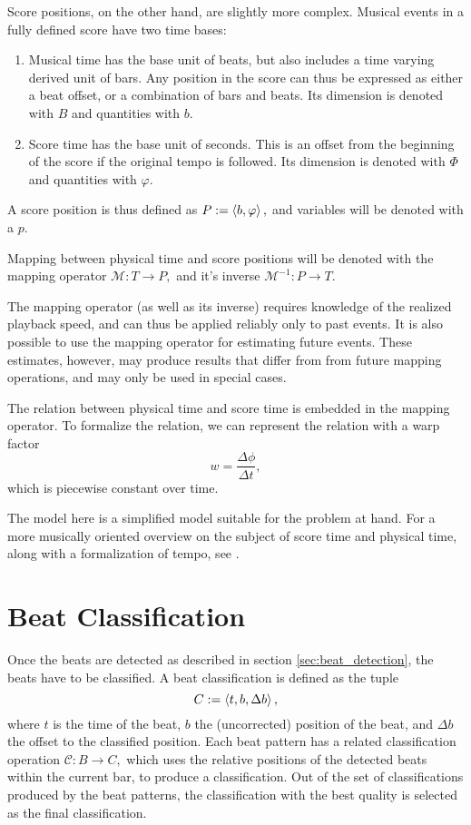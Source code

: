 Score positions, on the other hand,
are slightly more complex.
Musical events in a fully defined score have two time bases:
\begin{enumerate}
\item Musical time has the base unit of beats, but also includes a time varying derived unit of bars. Any position in the score can thus be expressed as either a beat offset, or a combination of bars and beats. Its dimension is denoted with $B$ and quantities with $b$.
\item Score time has the base unit of seconds. This is an offset from the beginning of the score if the original tempo is followed. Its dimension is denoted with $\Phi$ and quantities with $\varphi$.
\end{enumerate}
A score position is thus defined as
$ P := \left \langle b, \varphi \right \rangle , $
and variables will be denoted with a $p$.

Mapping between physical time and score positions will be denoted with
the mapping operator
$ \mathcal{M} : T \rightarrow P, $
and it's inverse
$ \mathcal{M}^{-1} : P \rightarrow T. $

The mapping operator (as well as its inverse)
requires knowledge of
the realized playback speed,
and can thus be applied reliably only to past events.
It is also possible to use the mapping operator for
estimating future events.
These estimates, however,
may produce results that differ from
from future mapping operations,
and may only be used in special cases.

The relation between physical time and score time
is embedded in the mapping operator.
To formalize the relation, we can
represent the relation with a warp factor
\begin{equation}
w = \frac{\Delta \phi}{\Delta t},
\end{equation}
which is piecewise constant over time.

The model here is a simplified model
suitable for the problem at hand.
For a more musically oriented overview
on the subject of score time and physical time,
along with a formalization of tempo,
see \cite{Mazzola2011}.


\section{Beat Classification}

Once the beats are detected as described
in section \ref{sec:beat_detection},
the beats have to be classified.
A beat classification is defined as the tuple
\[
C := \left \langle t, b, \Delta b \right \rangle ,
\]
where $t$ is the time of the beat,
$b$ the (uncorrected) position of the beat,
and $\Delta b$ the offset to the classified position.
Each beat pattern has a related
classification operation $ \mathcal{C} : B \rightarrow C, $
which uses the relative positions of the detected beats
within the current bar,
to produce a classification.
Out of the set of classifications produced by the beat patterns,
the classification with the best quality is
selected as the final classification.

